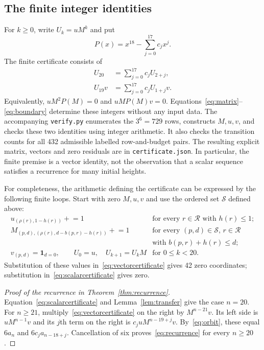 \documentclass[11pt,a4paper]{article}
\newcommand{\ind}{\mathbf 1}
\begin{document}
\subsection*{The finite integer identities}
For $k\geq0$, write $U_k=uM^k$ and put
\[
 P(x)=x^{18}-\sum_{j=0}^{17}c_jx^j.
\]
The finite certificate consists of
\begin{align}
 U_{20}&=\sum_{j=0}^{17}c_j U_{2+j},\label{eq:vectorcertificate}\\
 U_{19}v&=\sum_{j=0}^{17}c_j U_{1+j}v.\label{eq:scalarcertificate}
\end{align}
Equivalently, $uM^2P(M)=0$ and $uMP(M)v=0$.
Equations~\eqref{eq:matrix}--\eqref{eq:boundary} determine these integers
without any input data. The accompanying \texttt{verify.py} enumerates
the $3^6=729$ rows, constructs $M,u,v$, and checks these two identities
using integer arithmetic. It also checks the transition counts for all
432 admissible labelled row-and-budget pairs. The resulting explicit
matrix, vectors and zero residuals are in \texttt{certificate.json}.
In particular, the finite premise is a vector identity, not the observation
that a scalar sequence satisfies a recurrence for many initial heights.

For completeness, the arithmetic defining the certificate can be expressed
by the following finite loops. Start with zero $M,u,v$ and use the ordered
set $\mathcal S$ defined above:
\[
\begin{array}{ll}
u_{(\rho(r),1-h(r))}\mathrel{+}=1
  &\text{for every $r\in\mathcal R$ with $h(r)\leq1$};\\
M_{(p,d),(\rho(r),d-b(p,r)-h(r))}\mathrel{+}=1
  &\text{for every $(p,d)\in\mathcal S$, $r\in\mathcal R$}\\
  &\text{with $b(p,r)+h(r)\leq d$};\\
v_{(p,d)}=\ind_{d=0},\qquad U_0=u,\quad U_{k+1}=U_kM
  &\text{for $0\leq k<20$}.
\end{array}
\]
Substitution of these values in~\eqref{eq:vectorcertificate} gives 42
zero coordinates; substitution in~\eqref{eq:scalarcertificate} gives zero.

\begin{proof}[Proof of the recurrence in Theorem~\ref{thm:recurrence}]
Equation~\eqref{eq:scalarcertificate} and Lemma~\ref{lem:transfer} give
the case $n=20$. For $n\geq21$, multiply~\eqref{eq:vectorcertificate}
on the right by $M^{n-21}v$. Its left side is $uM^{n-1}v$ and its
$j$th term on the right is $c_j uM^{n-19+j}v$.
By~\eqref{eq:orbit}, these equal $6a_n$ and $6c_j a_{n-18+j}$.
Cancellation of six proves~\eqref{eq:recurrence} for every $n\geq20$.
\end{proof}
\end{document}
